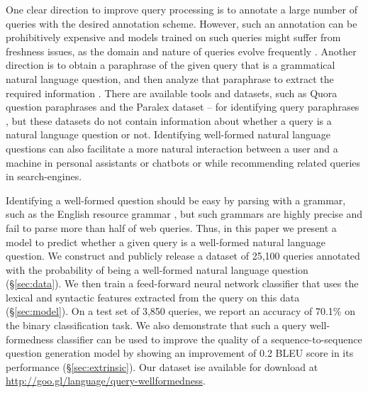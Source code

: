 \documentclass[11pt,a4paper]{article}
\begin{document}
One clear direction to improve query processing is to annotate a large number of queries with the desired annotation scheme.
However, such an annotation can be prohibitively expensive and models trained on such queries might suffer from
freshness issues, as the domain and nature of queries evolve frequently
\cite{markatos2001caching,Bawa:2003,roy12}.
Another direction is to obtain a paraphrase of the given query that is a grammatical natural language
question, and then analyze that paraphrase to extract the required information
\cite{nogueira-cho:2017:EMNLP2017,DBLP:journals/corr/BuckBCGHGW17}.
There are available tools and datasets, such as Quora question
paraphrases
and the Paralex dataset \cite{paralex}
-- for identifying query paraphrases \cite{wang2017bilateral,tomar2017neural},
but these datasets do not contain information about whether a query is a natural
language question or not. Identifying well-formed natural language
questions can also facilitate a more natural interaction between a user and a machine in
personal assistants or chatbots \cite{Yang:2014:ARQ,mostafazadeh:2016} or while 
recommending related queries in search-engines.

Identifying a well-formed question should be
easy by parsing with a grammar, such as the English resource grammar 
\cite{copestake2000open}, but such grammars are highly precise 
and fail to parse more than half of web queries.
Thus, in this paper we present a model to predict whether a given query is a well-formed natural language question. 
We construct and publicly release a dataset of 25,100 queries
annotated with the probability of being a well-formed natural language question
(\S\ref{sec:data}). We then train a feed-forward neural network classifier that uses 
the lexical and syntactic features extracted from the query on this data (\S\ref{sec:model}).
On a test set of 3,850 queries, we report an accuracy of 70.1\% on the binary classification task.
We also demonstrate that such a query well-formedness classifier can 
be used 
to improve the quality of a sequence-to-sequence question generation model \cite{du2017learning} by showing an improvement of 0.2 BLEU score in its performance (\S\ref{sec:extrinsic}). Our dataset ise available for download at \url{http://goo.gl/language/query-wellformedness}.
\end{document}
